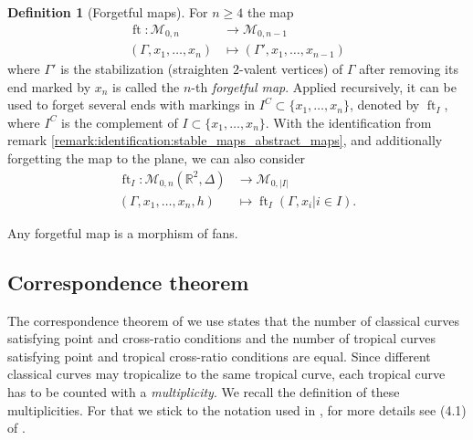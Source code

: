 \documentclass[11pt,reqno,a4]{amsart}
\theoremstyle{dotless}
\theoremstyle{definition}
\newtheorem{definition}[corollary]{Definition}
\begin{document}
\begin{definition}[Forgetful maps]
For $n\geq4$ the map
\begin{align*}
\operatorname{ft}:\mathcal{M}_{0,n}&\to\mathcal{M}_{0,n-1}\\
(\Gamma,x_1,\dots,x_n) &\mapsto (\Gamma',x_1,\dots,x_{n-1})
\end{align*}
where $\Gamma'$ is the stabilization (straighten $2$-valent vertices) of $\Gamma$ after removing its end marked by $x_n$ is called the $n$-th \textit{forgetful map}. Applied recursively, it can be used to forget several ends with markings in $I^C\subset \{x_1,\ldots,x_n\}$, denoted by $\operatorname{ft}_I$, where $I^C$ is the complement of $I\subset \{x_1,\ldots,x_n\}$. With the identification from remark \ref{remark:identification:stable_maps_abstract_maps}, and additionally forgetting the map to the plane, we can also consider 
\begin{align*}
\operatorname{ft}_I:\mathcal{M}_{0,n}\left(\mathbb{R}^2,\Delta\right) &\to\mathcal{M}_{0,|I|}\\
(\Gamma,x_1,\dots,x_n,h) &\mapsto \operatorname{ft}_I(\Gamma,x_i|i\in I).
\end{align*}
\end{definition}
Any forgetful map is a morphism of fans. 


\subsection*{Correspondence theorem}
The correspondence theorem of \cite{IlyaCRC} we use states that the number of classical curves satisfying point and cross-ratio conditions and the number of tropical curves satisfying point and tropical cross-ratio conditions are equal. Since different classical curves may tropicalize to the same tropical curve, each tropical curve has to be counted with a \textit{multiplicity}. We recall the definition of these multiplicities. For that we stick to the notation used in \cite{IlyaCRC}, for more details see (4.1) of \cite{IlyaCRC}.
\end{document}
